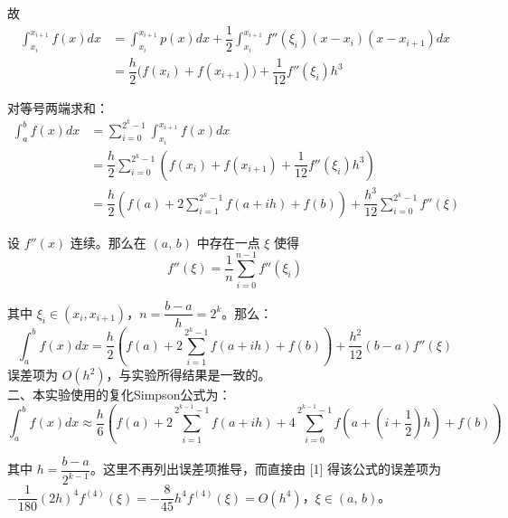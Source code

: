 \documentclass{ctexart}
\begin{document}
	故
	\begin{align*}
		\int_{x_i}^{x_{i+1}} f(x)dx & = \int_{x_i}^{x_{i+1}} p(x) dx + \dfrac{1}{2} \int_{x_i}^{x_{i+1}} f''(\xi_i)(x - x_{i})(x - x_{i+1}) dx\\
		& = \dfrac{h}{2} \Big(f(x_i) + f(x_{i+1})\Big) + \dfrac{1}{12}f''(\xi_i)h^3
	\end{align*}
	
	对等号两端求和：
	\begin{align*}
		\int_a^b f(x)dx & = \sum_{i = 0}^{2^k - 1}\int_{x_i}^{x_{i+1}} f(x)dx\\
		& = \dfrac{h}{2} \sum_{i = 0}^{2^k - 1}\left(f(x_i) + f(x_{i+1}) + \dfrac{1}{12}f''(\xi_i)h^3\right)\\
		& = \dfrac{h}{2}\left(f(a) + 2\sum_{i = 1}^{2^k - 1} f(a + ih) + f(b)\right) + \dfrac{h^3}{12}\sum_{i = 0}^{2^k - 1}f''(\xi)
	\end{align*}
	
	设 $f''(x)$ 连续。那么在 $(a,\,b)$ 中存在一点 $\xi$ 使得
	\begin{equation}
		f''(\xi) = \dfrac{1}{n}\sum_{i = 0}^{n - 1}f''(\xi_i)
	\end{equation}
	
	其中 $\xi_i \in (x_{i}, x_{i+1})$，$n = \dfrac{b - a}{h} = 2^k$。那么：
	\begin{equation}
		\int_a^b f(x)dx = \dfrac{h}{2}\left(f(a) + 2\sum_{i = 1}^{2^k - 1} f(a + ih) + f(b)\right) + \dfrac{h^2}{12}(b - a)f''(\xi)
	\end{equation}
	误差项为 $O(h^2)$，与实验所得结果是一致的。\\
	
	二、本实验使用的复化Simpson公式为：
	\begin{equation}
		\int_a^b f(x)dx \approx \dfrac{h}{6}\left(f(a) + 2\sum_{i = 1}^{2^{k-1} - 1} f(a + ih) + 4\sum_{i = 0}^{2^{k-1} - 1} f(a + (i+\dfrac{1}{2})h) + f(b)\right)
	\end{equation}
	
	其中 $h = \dfrac{b - a}{2^{k-1}}$。这里不再列出误差项推导，而直接由 [1] 得该公式的误差项为 $-\dfrac{1}{180}(2h)^4 f^{(4)}(\xi) = -\dfrac{8}{45}h^4 f^{(4)}(\xi) = O(h^4)$，$\xi \in (a,\,b)$。\\
	
\end{document}

